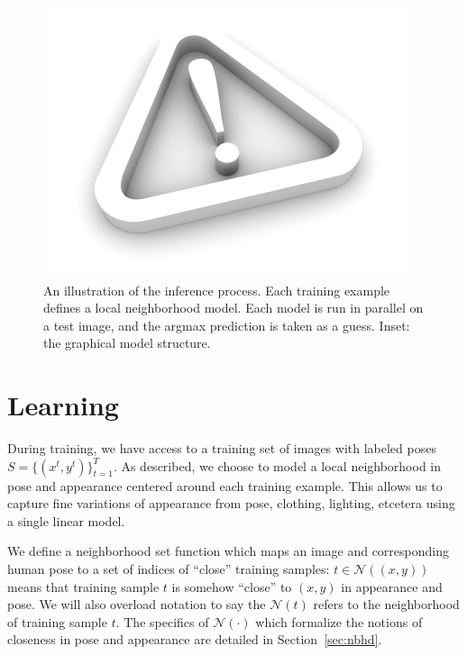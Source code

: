 \begin{figure}[tb!]
\centering
\includegraphics[width=0.99\linewidth]{figs/empty.jpg}
\caption{\small \label{fig:inference} An illustration of the inference process.  Each training example defines a local neighborhood model.  Each model is run in parallel on a test image, and the argmax prediction is taken as a guess. Inset: the graphical model structure.}
\end{figure}

\section{Learning}\label{sec:learning}

During training, we have access to a training set of images with labeled poses $S = \{(x^{t},y^{t})\}_{t=1}^T$.  As described, we choose to model a local neighborhood in pose and appearance centered around each training example.  This allows us to capture fine variations of appearance from pose, clothing, lighting, etcetera using a single linear model.

We define a neighborhood set function which maps an image and corresponding human pose to a set of indices of ``close'' training samples: $t \in \mathcal{N}((x,y))$ means that training sample $t$ is somehow ``close'' to $(x,y)$ in appearance and pose.  We will also overload notation to say the $\mathcal{N}(t)$ refers to the neighborhood of training sample $t$.  The specifics of $\mathcal{N}(\cdot)$ which formalize the notions of closeness in pose and appearance are detailed in Section~\ref{sec:nbhd}.

